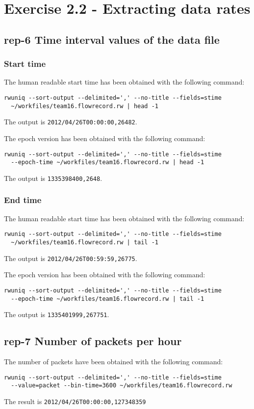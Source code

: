 \section*{Exercise 2.2 - Extracting data rates}

\subsection*{rep-6 Time interval values of the data file}
\subsubsection*{Start time}
The human readable start time has been obtained with the following command:
\begin{verbatim}
rwuniq --sort-output --delimited=',' --no-title --fields=stime
  ~/workfiles/team16.flowrecord.rw | head -1
\end{verbatim}
The output is \texttt{2012/04/26T00:00:00,26482}.

The epoch version has been obtained with the following command:
\begin{verbatim}
rwuniq --sort-output --delimited=',' --no-title --fields=stime
  --epoch-time ~/workfiles/team16.flowrecord.rw | head -1
\end{verbatim}
The output is \texttt{1335398400,2648}.

\subsubsection*{End time}
The human readable start time has been obtained with the following command:
\begin{verbatim}
rwuniq --sort-output --delimited=',' --no-title --fields=stime
  ~/workfiles/team16.flowrecord.rw | tail -1
\end{verbatim}
The output is \texttt{2012/04/26T00:59:59,26775}.

The epoch version has been obtained with the following command:
\begin{verbatim}
rwuniq --sort-output --delimited=',' --no-title --fields=stime
  --epoch-time ~/workfiles/team16.flowrecord.rw | tail -1
\end{verbatim}
The output is \texttt{1335401999,267751}.


\subsection*{rep-7 Number of packets per hour}
The number of packets have been obtained with the following command:
\begin{verbatim}
rwuniq --sort-output --delimited=',' --no-title --fields=stime
  --value=packet --bin-time=3600 ~/workfiles/team16.flowrecord.rw
\end{verbatim}
The result is \texttt{2012/04/26T00:00:00,127348359}

